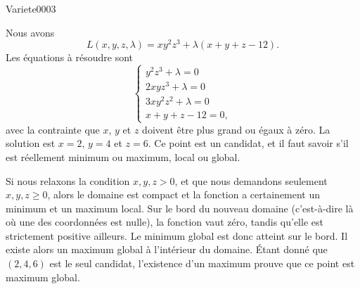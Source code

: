 
\begin{corrige}{Variete0003}

	Nous avons
	\begin{equation}
		L(x,y,z,\lambda)=xy^2z^3+\lambda(x+y+z-12).
	\end{equation}
	Les équations à résoudre sont
	\begin{equation}
		\left\{
		\begin{array}{ll}
			y^2z^3+\lambda=0\\
			2xyz^3+\lambda=0\\
			3xy^2z^2+\lambda=0\\
			x+y+z-12=0,
		\end{array}
		\right.
	\end{equation}
	avec la contrainte que $x$, $y$ et $z$ doivent être plus grand ou égaux à zéro. La solution est $x=2$, $y=4$ et $z=6$. Ce point est un candidat, et il faut savoir s'il est réellement minimum ou maximum, local ou global.

	Si nous relaxons la condition $x,y,z>0$, et que nous demandons seulement $x,y,z\geq 0$, alors le domaine est compact et la fonction a certainement un minimum et un maximum local. Sur le bord du nouveau domaine (c'est-à-dire là où une des coordonnées est nulle), la fonction vaut zéro, tandis qu'elle est strictement positive ailleurs. Le minimum global est donc atteint sur le bord. Il existe alors un maximum global à l'intérieur du domaine. Étant donné que $(2,4,6)$ est le seul candidat, l'existence d'un maximum prouve que ce point est maximum global.

\end{corrige}
